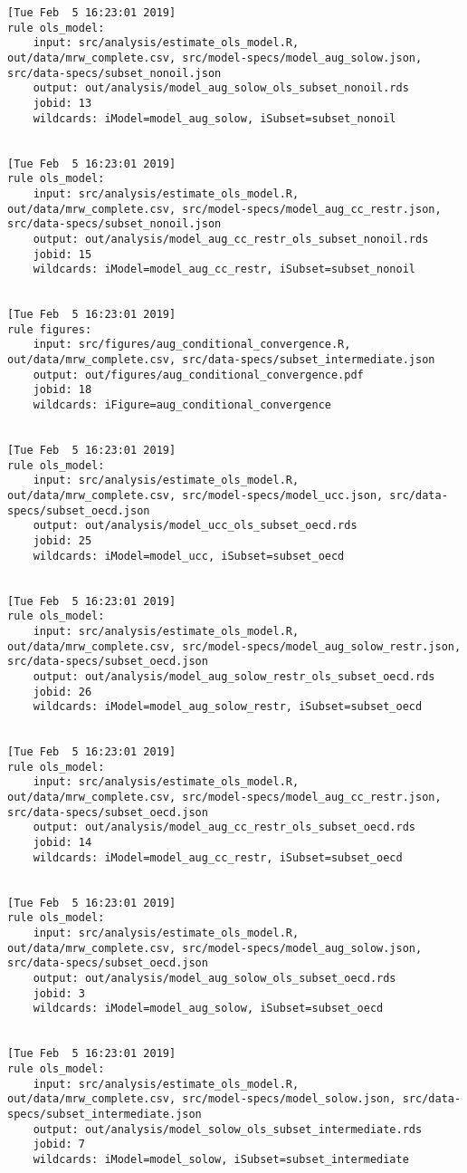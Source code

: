 \documentclass[]{book}
\theoremstyle{definition}
\theoremstyle{definition}
\theoremstyle{definition}
\theoremstyle{remark}
\begin{document}
\begin{verbatim}
[Tue Feb  5 16:23:01 2019]
rule ols_model:
    input: src/analysis/estimate_ols_model.R, out/data/mrw_complete.csv, src/model-specs/model_aug_solow.json, src/data-specs/subset_nonoil.json
    output: out/analysis/model_aug_solow_ols_subset_nonoil.rds
    jobid: 13
    wildcards: iModel=model_aug_solow, iSubset=subset_nonoil


[Tue Feb  5 16:23:01 2019]
rule ols_model:
    input: src/analysis/estimate_ols_model.R, out/data/mrw_complete.csv, src/model-specs/model_aug_cc_restr.json, src/data-specs/subset_nonoil.json
    output: out/analysis/model_aug_cc_restr_ols_subset_nonoil.rds
    jobid: 15
    wildcards: iModel=model_aug_cc_restr, iSubset=subset_nonoil


[Tue Feb  5 16:23:01 2019]
rule figures:
    input: src/figures/aug_conditional_convergence.R, out/data/mrw_complete.csv, src/data-specs/subset_intermediate.json
    output: out/figures/aug_conditional_convergence.pdf
    jobid: 18
    wildcards: iFigure=aug_conditional_convergence


[Tue Feb  5 16:23:01 2019]
rule ols_model:
    input: src/analysis/estimate_ols_model.R, out/data/mrw_complete.csv, src/model-specs/model_ucc.json, src/data-specs/subset_oecd.json
    output: out/analysis/model_ucc_ols_subset_oecd.rds
    jobid: 25
    wildcards: iModel=model_ucc, iSubset=subset_oecd


[Tue Feb  5 16:23:01 2019]
rule ols_model:
    input: src/analysis/estimate_ols_model.R, out/data/mrw_complete.csv, src/model-specs/model_aug_solow_restr.json, src/data-specs/subset_oecd.json
    output: out/analysis/model_aug_solow_restr_ols_subset_oecd.rds
    jobid: 26
    wildcards: iModel=model_aug_solow_restr, iSubset=subset_oecd


[Tue Feb  5 16:23:01 2019]
rule ols_model:
    input: src/analysis/estimate_ols_model.R, out/data/mrw_complete.csv, src/model-specs/model_aug_cc_restr.json, src/data-specs/subset_oecd.json
    output: out/analysis/model_aug_cc_restr_ols_subset_oecd.rds
    jobid: 14
    wildcards: iModel=model_aug_cc_restr, iSubset=subset_oecd


[Tue Feb  5 16:23:01 2019]
rule ols_model:
    input: src/analysis/estimate_ols_model.R, out/data/mrw_complete.csv, src/model-specs/model_aug_solow.json, src/data-specs/subset_oecd.json
    output: out/analysis/model_aug_solow_ols_subset_oecd.rds
    jobid: 3
    wildcards: iModel=model_aug_solow, iSubset=subset_oecd


[Tue Feb  5 16:23:01 2019]
rule ols_model:
    input: src/analysis/estimate_ols_model.R, out/data/mrw_complete.csv, src/model-specs/model_solow.json, src/data-specs/subset_intermediate.json
    output: out/analysis/model_solow_ols_subset_intermediate.rds
    jobid: 7
    wildcards: iModel=model_solow, iSubset=subset_intermediate



\end{verbatim}
\end{document}

